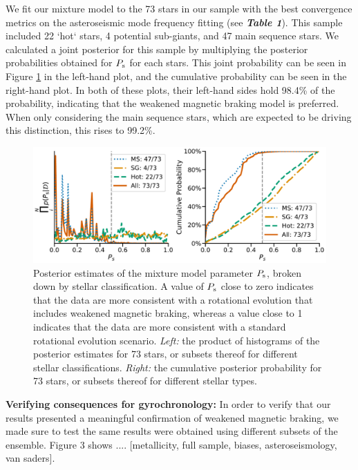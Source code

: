 \documentclass[12pt]{article}
\begin{document}
We fit our mixture model to the 73 stars in our sample with the best convergence metrics on the asteroseismic mode frequency fitting (see \textbf{\textit{Table 1}}). This sample included 22 `hot` stars, 4 potential sub-giants, and 47 main sequence stars. We calculated a joint posterior for this sample by multiplying the posterior probabilities obtained for $P_{\rm s}$ for each stars. This joint probability can be seen in Figure \ref{fig:gyroresults} in the left-hand plot, and the cumulative probability can be seen in the right-hand plot. In both of these plots, their left-hand sides hold 98.4\% of the probability, indicating that the weakened magnetic braking model is preferred. When only considering the main sequence stars, which are expected to be driving this distinction, this rises to 99.2\%. 

\begin{figure}
	\centering
	\includegraphics[width=\textwidth]{modelresults.pdf}
	\caption{Posterior estimates of the mixture model parameter $P_{\rm s}$, broken down by stellar classification. A value of $P_{\rm s}$ close to zero indicates that the data are more consistent with a rotational evolution that includes weakened magnetic braking, whereas a value close to 1 indicates that the data are more consistent with a standard rotational evolution scenario. \textit{Left:} the product of histograms of the posterior estimates for 73 stars, or subsets thereof for different stellar classifications. \textit{Right:} the cumulative posterior probability for 73 stars, or subsets thereof for different stellar types.}
	\label{fig:gyroresults}
\end{figure}

\textbf{Verifying consequences for gyrochronology:} In order to verify that our results presented a meaningful confirmation of weakened magnetic braking, we made sure to test the same results were obtained using different subsets of the ensemble. Figure 3 shows .... [metallicity, full sample, biases, asteroseismology, van saders].\\
\end{document}

